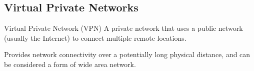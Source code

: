\documentclass[\main/notes.tex]{subfiles}
\begin{document}
			\subsection{Virtual Private Networks}
				\begin{definition}{Virtual Private Network (VPN)}
					A private network that uses a public network (usually the Internet) to connect multiple remote locations.

					Provides network connectivity over a potentially long physical distance, and can be considered a form of wide area network.
				\end{definition}

	\vbox{}
\end{document}
